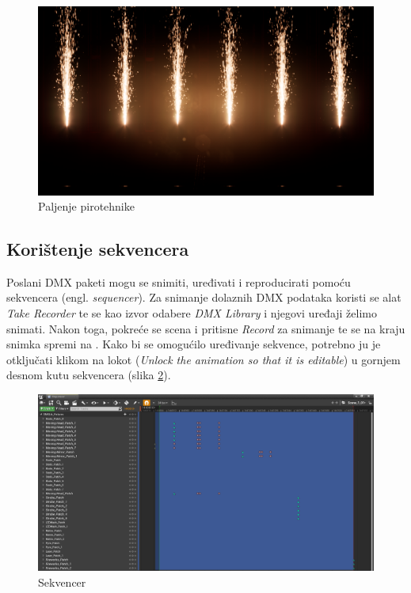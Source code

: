 \documentclass[times, utf8, zavrsni, numeric]{fer}
\begin{document}
\begin{figure}[htp]
	\centering
	\includegraphics[width=\linewidth]{slika 6-11.png}
	\caption{Paljenje pirotehnike}
	\label{fig:slika 6-11}
\end{figure}

\subsection{Korištenje sekvencera}
Poslani DMX paketi mogu se snimiti, uređivati i reproducirati pomoću sekvencera (engl. \emph{sequencer}). Za snimanje dolaznih DMX podataka koristi se alat \emph{Take Recorder} te se kao izvor odabere \emph{DMX Library} i njegovi uređaji želimo snimati. Nakon toga, pokreće se scena i pritisne \emph{Record} za snimanje te se na kraju snimka spremi na . Kako bi se omogućilo uređivanje sekvence, potrebno ju je otključati klikom na lokot (\emph{Unlock the animation so that it is editable}) u gornjem desnom kutu sekvencera (slika \ref{fig:slika 6-12}).\\

\begin{figure}[htp]
	\centering
	\includegraphics[width=\linewidth]{slika 6-12.png}
	\caption{Sekvencer}
	\label{fig:slika 6-12}
\end{figure}
\end{document}
